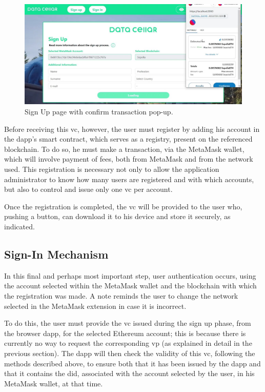 \begin{figure}[h]  
  \centering
  \includegraphics[width=1\textwidth]{Images/c6_2.jpg} 
  \caption{Sign Up page with confirm transaction pop-up.}
\end{figure}

Before receiving this \gls{vc}, however, the user must register by adding his account in the \gls{dapp}'s smart contract, which serves as a registry, present on the referenced 
blockchain. To do so, he must make a transaction, via the MetaMask wallet, which will involve payment of fees, both from MetaMask and from the network used. This 
registration is necessary not only to allow the application administrator to know how many users are registered and with which accounts, but also to control and issue only 
one \gls{vc} per account.



Once the registration is completed, the \gls{vc} will be provided to the user who, pushing a button, can download it to his device and store it securely, as indicated.

\subsection{Sign-In Mechanism}

In this final and perhaps most important step, user authentication occurs, using the account selected within the MetaMask wallet and the blockchain with which the 
registration was made. A note reminds the user to change the network selected in the MetaMask extension in case it is incorrect.

To do this, the user must provide the \gls{vc} issued during the sign up phase, from the browser \gls{dapp}, for the selected Ethereum account; this is because there is 
currently no way to request the corresponding \gls{vp} (as explained in detail in the previous section). The \gls{dapp} will then check the validity of this \gls{vc}, following the 
methods described above, to ensure both that it has been issued by the \gls{dapp} and that it contains the \gls{did}, associated with the account selected by the user, in his 
MetaMask wallet, at that time.

